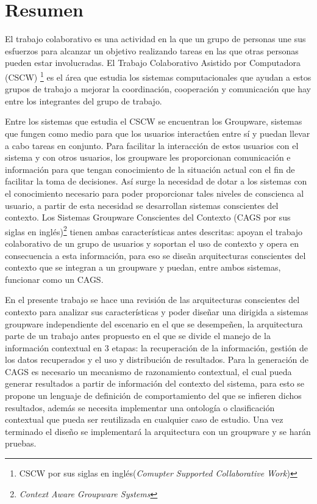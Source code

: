 \section*{Resumen}
El trabajo colaborativo es una actividad en la que un grupo de personas une sus esfuerzos para alcanzar un objetivo realizando tareas en las que otras personas pueden estar involucradas. El Trabajo Colaborativo Asistido por Computadora (CSCW) \footnote{CSCW por sus siglas en ingl\'es(\textit{Comupter Supported Collaborative Work})} es el \'area que estudia los sistemas computacionales que ayudan a estos grupos de trabajo a mejorar la coordinaci\'on, cooperaci\'on y comunicaci\'on que hay entre los integrantes del grupo de trabajo.

Entre los sistemas que estudia el CSCW se encuentran los Groupware, sistemas que fungen como medio para que los usuarios interact\'uen entre s\'i y puedan llevar a cabo tareas en conjunto. Para facilitar la interacci\'on de estos usuarios con el sistema y con otros usuarios, los groupware les proporcionan comunicaci\'on e informaci\'on para que tengan conocimiento de la situaci\'on actual con el fin de facilitar la toma de decisiones. As\'i surge la necesidad de dotar a los sistemas con el conocimiento necesario para poder proporcionar tales niveles de conscienca al usuario, a partir de esta necesidad se desarrollan sistemas conscientes del contexto. Los Sistemas Groupware Conscientes del Contexto (CAGS por sus siglas en ingl\'es)\footnote{ \textit{Context Aware Groupware Systems}} tienen ambas caracter\'isticas antes descritas: apoyan el trabajo colaborativo de un grupo de usuarios y soportan el uso de contexto y opera en consecuencia a esta informaci\'on, para eso se dise\~an arquitecturas conscientes del contexto que se integran a un groupware y puedan, entre ambos sistemas, funcionar como un CAGS. 

En el presente trabajo se hace una revisi\'on de las arquitecturas conscientes del contexto para analizar sus caracter\'isticas y poder dise\~nar una dirigida a sistemas groupware independiente del escenario en el que se desempe\~nen, la arquitectura parte de un trabajo antes propuesto\cite{montane2013context} en el que se divide el manejo de la informaci\'on contextual en 3 etapas: la recuperaci\'on de la informaci\'on, gesti\'on de los datos recuperados y el uso y distribuci\'on de resultados. Para la generaci\'on de CAGS es necesario un mecanismo de razonamiento contextual, el cual pueda generar resultados a partir de informaci\'on del contexto del sistema, para esto se propone un lenguaje de definici\'on de comportamiento del que se infieren dichos resultados, adem\'as se necesita implementar una ontolog\'ia o clasificaci\'on contextual que pueda ser reutilizada en cualquier caso de estudio. Una vez terminado el dise\~no se implementar\'a la arquitectura con un groupware y se har\'an pruebas.

